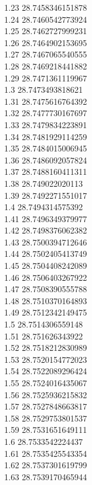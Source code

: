 {1.23	28.7458346151878\\
1.24	28.7460542773924\\
1.25	28.7462727999231\\
1.26	28.7464902153695\\
1.27	28.7467065540555\\
1.28	28.7469218441882\\
1.29	28.7471361119967\\
1.3	28.7473493818621\\
1.31	28.7475616764392\\
1.32	28.7477730167697\\
1.33	28.7479834223891\\
1.34	28.7481929114259\\
1.35	28.7484015006945\\
1.36	28.7486092057824\\
1.37	28.7488160411311\\
1.38	28.749022020113\\
1.39	28.7492271551017\\
1.4	28.7494314575392\\
1.41	28.7496349379977\\
1.42	28.7498376062382\\
1.43	28.7500394712646\\
1.44	28.7502405413749\\
1.45	28.7504408242089\\
1.46	28.7506403267922\\
1.47	28.7508390555788\\
1.48	28.7510370164893\\
1.49	28.7512342149475\\
1.5	28.7514306559148\\
1.51	28.751626343922\\
1.52	28.7518212830989\\
1.53	28.7520154772023\\
1.54	28.7522089296424\\
1.55	28.7524016435067\\
1.56	28.7525936215832\\
1.57	28.7527848663817\\
1.58	28.7529753801537\\
1.59	28.7531651649111\\
1.6	28.7533542224437\\
1.61	28.7535425543354\\
1.62	28.7537301619799\\
1.63	28.7539170465944\\
}
